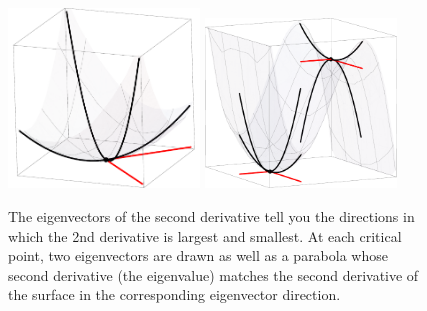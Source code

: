 \begin{figure}[ht
]\begin{center}
\includegraphics[width=2in]{03-Linear-Algebra-Applications/support/2nddertest1}
\hspace{.5in}
\includegraphics[width=2in]{03-Linear-Algebra-Applications/support/2nddertest2}
\end{center}
\caption{The eigenvectors of the second derivative tell you the directions in which the 2nd derivative is largest and smallest. At each critical point, two eigenvectors are drawn as well as a parabola whose second derivative (the eigenvalue) matches the second derivative of the surface in the corresponding eigenvector direction.}
\label{2ndder}
\end{figure}


